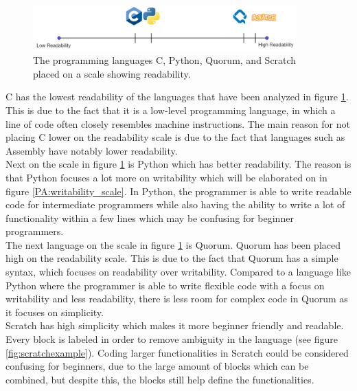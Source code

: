 \begin{figure}[H] 
    \begin{center}
        \includegraphics[width=0.9\textwidth]{Files/Billeder: Analyse/Readability.png}
    \end{center}
    \caption{The programming languages C, Python, Quorum, and Scratch placed on a scale showing readability.}
    \label{PA:readability_scale}
\end{figure}

C has the lowest readability of the languages that have been analyzed in figure \ref{PA:readability_scale}. This is due to the fact that it is a low-level programming language, in which a line of code often closely resembles machine instructions. The main reason for not placing C lower on the readability scale is due to the fact that languages such as Assembly have notably lower readability. \\

Next on the scale in figure \ref{PA:readability_scale} is Python which has better readability. The reason is that Python focuses a lot more on writability which will be elaborated on in figure \ref{PA:writability_scale}. In Python, the programmer is able to write readable code for intermediate programmers while also having the ability to write a lot of functionality within a few lines which may be confusing for beginner programmers.\\

The next language on the scale in figure \ref{PA:readability_scale} is Quorum. Quorum has been placed high on the readability scale. This is due to the fact that Quorum has a simple syntax, which focuses on readability over writability. Compared to a language like Python where the programmer is able to write flexible code with a focus on writability and less readability, there is less room for complex code in Quorum as it focuses on simplicity.\\

Scratch has high simplicity which makes it more beginner friendly and readable. Every block is labeled in order to remove ambiguity in the language (see figure \ref{fig:scratchexample}). Coding larger functionalities in Scratch could be considered confusing for beginners, due to the large amount of blocks which can be combined, but despite this, the blocks still help define the functionalities.\\

